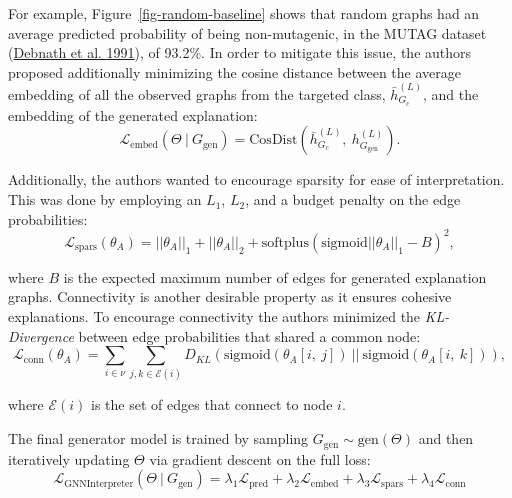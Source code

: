 \documentclass[
  11pt,
  letterpaper,
]{article}
\begin{document}
For example, Figure~\ref{fig-random-baseline} shows that random graphs
had an average predicted probability of being non-mutagenic, in the
MUTAG dataset (\protect\hyperlink{ref-Debnath_1991}{Debnath et al.
1991}), of 93.2\%. In order to mitigate this issue, the authors proposed
additionally minimizing the cosine distance between the average
embedding of all the observed graphs from the targeted class,
\(\bar h^{(L)}_{G_c}\), and the embedding of the generated explanation:
\begin{equation} \label{l-embed}
    \mathcal{L}_{\text{embed}}(\Theta \ | \ G_\text{gen}) = \text{CosDist}\left( \bar h^{(L)}_{G_c}, \ h^{(L)}_{G_\text{gen}} \right). 
\end{equation}

Additionally, the authors wanted to encourage sparsity for ease of
interpretation. This was done by employing an \(L_1\), \(L_2\), and a
budget penalty on the edge probabilities:\\
\begin{equation} \label{l-spars}
    \mathcal{L}_{\text{spars}}(\theta_A) = ||\theta_A||_1 + ||\theta_A||_2 + \text{softplus}(\text{sigmoid}||\theta_A||_1 - B)^2, 
\end{equation}

where \(B\) is the expected maximum number of edges for generated
explanation graphs. Connectivity is another desirable property as it
ensures cohesive explanations. To encourage connectivity the authors
minimized the \emph{KL-Divergence} between edge probabilities that
shared a common node: \begin{equation}
    \mathcal{L}_{\text{conn}}(\theta_A) = \sum_{i \in \nu} \sum_{j, k \in \mathcal{E}(i)} D_{KL}(\text{sigmoid}(\theta_A[i, \ j]) \ || \ \text{sigmoid}(\theta_A[i, \ k])), 
\end{equation}

where \(\mathcal{E}(i)\) is the set of edges that connect to node \(i\).

\quad The final generator model is trained by sampling
\(G_\text{gen} \sim \text{gen}(\Theta)\) and then iteratively updating
\(\Theta\) via gradient descent on the full loss: \begin{equation}
    \mathcal{L}_{\text{GNNInterpreter}}(\Theta \ | \ G_\text{gen}) = 
    \lambda_1 \mathcal{L}_{\text{pred}} + 
    \lambda_2 \mathcal{L}_{\text{embed}} + 
    \lambda_3 \mathcal{L}_{\text{spars}} +
    \lambda_4 \mathcal{L}_{\text{conn}} 
\end{equation}
\end{document}
